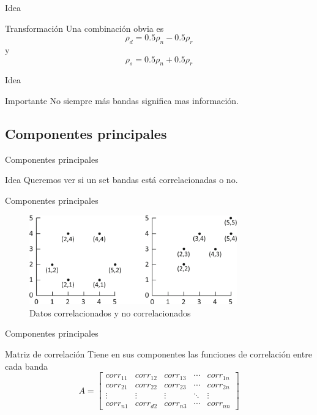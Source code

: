 \documentclass[]{beamer}
\begin{document}
\begin{frame}{Idea}
  \begin{alertblock}{Transformación}
    Una combinación obvia es $$ \rho_d = 0.5\rho_n-0.5\rho_r$$
    y
    $$ \rho_s = 0.5\rho_n+0.5\rho_r $$
  \end{alertblock}
\end{frame}


\begin{frame}{Idea}
  \begin{alertblock}{Importante}
    No siempre más bandas significa mas información.
  \end{alertblock}
\end{frame}

\subsection{Componentes principales}

\begin{frame}{Componentes principales}
  \begin{block}{Idea}
    Queremos ver si un set bandas está correlacionadas o no.
  \end{block}
\end{frame}

\begin{frame}{Componentes principales}
  \begin{figure}
  \centering
  \includegraphics[width=0.8\textwidth]{imagenes/corr.png}
  \caption{Datos correlacionados y no correlacionados}
  \end{figure}
\end{frame}

\begin{frame}{Componentes principales}
  \begin{block}{Matriz de correlación}
    Tiene en sus componentes las funciones de correlación entre cada banda\pause
    \[
    A = \begin{bmatrix}
        corr_{11}       & corr_{12} & corr_{13} & \cdots & corr_{1n} \\
        corr_{21}       & corr_{22} & corr_{23} & \cdots & corr_{2n} \\
        \vdots          & \vdots    & \vdots    & \ddots & \vdots \\
        corr_{n1}       & corr_{d2} & corr_{n3} & \cdots & corr_{nn}
    \end{bmatrix} \]
  \end{block}
\end{frame}
\end{document}
